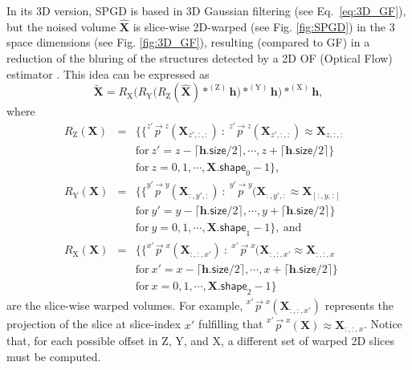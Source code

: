 \documentclass{article}
\begin{document}
In its 3D version, SPGD is based in 3D Gaussian filtering (see
Eq.~\ref{eq:3D_GF}), but the noised volume $\hat{\mathbf{X}}$ is
slice-wise 2D-warped (see Fig. \ref{fig:SPGD}) in the 3 space
dimensions (see Fig. \ref{fig:3D_GF}), resulting (compared to GF) in a
reduction of the bluring of the structures detected by a 2D OF
(Optical Flow) estimator \cite{gonzalez2023structure}. This idea can
be expressed as
\begin{equation}
  \tilde{\mathbf{X}}  = R_\text{X}\Big(R_\text{Y}\big(R_\text{Z}(\hat{\mathbf{X}})*^{(\text{Z})}{\mathbf h}\big)*^{(\text{Y})}{\mathbf h}\Big)*^{(\text{X})}{\mathbf h},
    \label{eq:SDPG}
\end{equation}
where
\begin{equation*}
  \begin{array}{rclll}
    R_\text{Z}(\mathbf{X}) & = & \big\{ \{ \overset{z'\rightarrow z}p(\mathbf{X}_{z',:,:})~:~\overset{z'\rightarrow z}p(\mathbf{X}_{z',:,:})\approx\mathbf{X}_{z,:,:} & \\ & & \text{for}~z'=z-\lceil\mathbf{h}.\mathsf{size}/2\rceil,\cdots,z+\lceil\mathbf{h}.\mathsf{size}/2\rceil\} & \\ & & \text{for}~z=0,1,\cdots,\mathbf{X}.\mathsf{shape}_0-1\big\}, \\
    R_\text{Y}(\mathbf{X}) & = & \big\{ \{ \overset{y'\rightarrow y}p(\mathbf{X}_{:,y',:})~:~\overset{y'\rightarrow y}p(\mathbf{X}_{:,y',:}\approx\mathbf{X}_{[:,y,:]} & \\ & & \text{for}~y'=y-\lceil\mathbf{h}.\mathsf{size}/2\rceil,\cdots,y+\lceil\mathbf{h}.\mathsf{size}/2\rceil\} & \\ & & \text{for}~y=0,1,\cdots,\mathbf{X}.\mathsf{shape}_1-1\big\},~\text{and} \\
    R_\text{X}(\mathbf{X}) & = & \big\{ \{ \overset{x'\rightarrow x}p(\mathbf{X}_{:,:,x'})~:~\overset{x'\rightarrow x}p(\mathbf{X}_{:,:,x'}\approx\mathbf{X}_{:,:,x} & \\ & & \text{for}~x'=x-\lceil\mathbf{h}.\mathsf{size}/2\rceil,\cdots,x+\lceil\mathbf{h}.\mathsf{size}/2\rceil\} & \\ & & \text{for}~x=0,1,\cdots,\mathbf{X}.\mathsf{shape}_2-1\big\}
    \end{array}
\end{equation*}
are the slice-wise warped volumes. For example,
$\overset{x'\rightarrow x}p(\mathbf{X}_{:,:,x'})$ represents the
projection of the slice at slice-index $x'$ fulfilling that
$\overset{x'\rightarrow
  x}p({\mathbf{X}})\approx{\mathbf{X}}_{:,:,x}$. Notice that, for
each possible offset in $\text{Z}$, $\text{Y}$, and $\text{X}$, a
different set of warped 2D slices must be computed.
\end{document}
